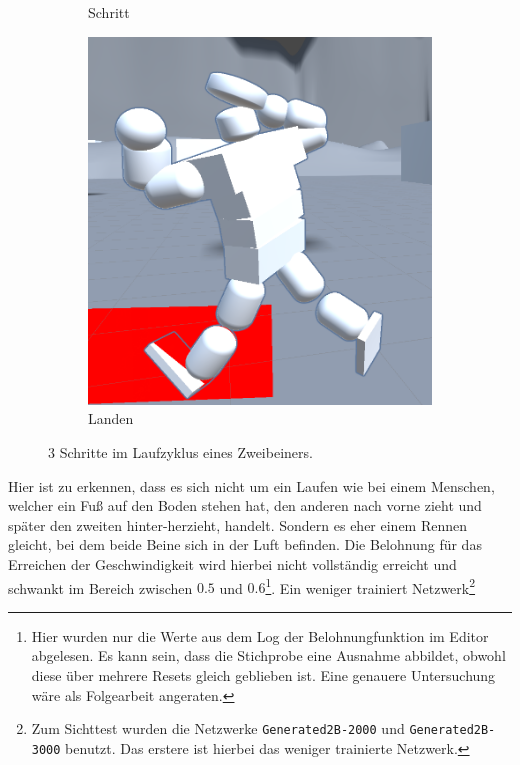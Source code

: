 \begin{figure}
\begin{subfigure}[b]{0.3\textwidth}
		\caption{Schritt}
		\label{fig:Laufen2}
	\end{subfigure}
	\hfill
	\begin{subfigure}[b]{0.3\textwidth}
		\centering
		\includegraphics[width=\textwidth]{resources/img/Unity3}
		\caption{Landen}
		\label{fig:Laufen3}
	\end{subfigure}
	\caption{3 Schritte im Laufzyklus eines Zweibeiners.}
	\label{fig:2BLaufen}
\end{figure}

Hier ist zu erkennen, dass es sich nicht um ein Laufen wie bei einem Menschen, welcher ein Fuß auf den Boden stehen hat, den anderen nach vorne zieht und später den zweiten hinter-herzieht, handelt. Sondern es eher einem Rennen gleicht, bei dem beide Beine sich in der Luft befinden. Die Belohnung für das Erreichen der Geschwindigkeit wird hierbei nicht vollständig erreicht und schwankt im Bereich zwischen $0.5$ und $0.6$\footnote{Hier wurden nur die Werte aus dem Log der Belohnungfunktion im Editor abgelesen. Es kann sein, dass die Stichprobe eine Ausnahme abbildet, obwohl diese über mehrere Resets gleich geblieben ist. Eine genauere Untersuchung wäre als Folgearbeit angeraten.}.  Ein weniger trainiert Netzwerk\footnote{Zum Sichttest wurden die Netzwerke \texttt{Generated2B-2000} und \texttt{Generated2B-3000} benutzt. Das erstere ist hierbei das weniger trainierte Netzwerk.} 

